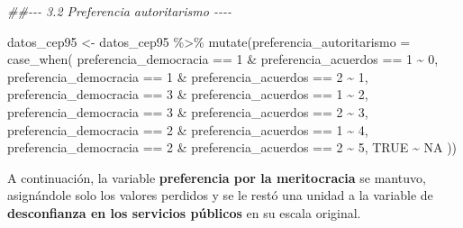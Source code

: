 \documentclass[
  spanish,
  a4paper,
  oneside]{scrbook}
\newenvironment{Shaded}{\begin{snugshade}}{\end{snugshade}}
\newcommand{\AttributeTok}[1]{\textcolor[rgb]{0.40,0.45,0.13}{#1}}
\newcommand{\ConstantTok}[1]{\textcolor[rgb]{0.56,0.35,0.01}{#1}}
\newcommand{\DecValTok}[1]{\textcolor[rgb]{0.68,0.00,0.00}{#1}}
\newcommand{\DocumentationTok}[1]{\textcolor[rgb]{0.37,0.37,0.37}{\textit{#1}}}
\newcommand{\FunctionTok}[1]{\textcolor[rgb]{0.28,0.35,0.67}{#1}}
\newcommand{\NormalTok}[1]{\textcolor[rgb]{0.00,0.23,0.31}{#1}}
\newcommand{\OtherTok}[1]{\textcolor[rgb]{0.00,0.23,0.31}{#1}}
\newcommand{\SpecialCharTok}[1]{\textcolor[rgb]{0.37,0.37,0.37}{#1}}
\begin{document}
\begin{Shaded}
\begin{Highlighting}[]
\DocumentationTok{\#\#{-}{-}{-} 3.2 Preferencia autoritarismo {-}{-}{-}{-}}

\NormalTok{datos\_cep95 }\OtherTok{\textless{}{-}}\NormalTok{ datos\_cep95 }\SpecialCharTok{\%\textgreater{}\%} 
  \FunctionTok{mutate}\NormalTok{(}\AttributeTok{preferencia\_autoritarismo =} \FunctionTok{case\_when}\NormalTok{(}
\NormalTok{    preferencia\_democracia }\SpecialCharTok{==} \DecValTok{1} \SpecialCharTok{\&}\NormalTok{ preferencia\_acuerdos }\SpecialCharTok{==} \DecValTok{1} \SpecialCharTok{\textasciitilde{}} \DecValTok{0}\NormalTok{, }
\NormalTok{    preferencia\_democracia }\SpecialCharTok{==} \DecValTok{1} \SpecialCharTok{\&}\NormalTok{ preferencia\_acuerdos }\SpecialCharTok{==} \DecValTok{2} \SpecialCharTok{\textasciitilde{}} \DecValTok{1}\NormalTok{,}
\NormalTok{    preferencia\_democracia }\SpecialCharTok{==} \DecValTok{3} \SpecialCharTok{\&}\NormalTok{ preferencia\_acuerdos }\SpecialCharTok{==} \DecValTok{1} \SpecialCharTok{\textasciitilde{}} \DecValTok{2}\NormalTok{, }
\NormalTok{    preferencia\_democracia }\SpecialCharTok{==} \DecValTok{3} \SpecialCharTok{\&}\NormalTok{ preferencia\_acuerdos }\SpecialCharTok{==} \DecValTok{2} \SpecialCharTok{\textasciitilde{}} \DecValTok{3}\NormalTok{, }
\NormalTok{    preferencia\_democracia }\SpecialCharTok{==} \DecValTok{2} \SpecialCharTok{\&}\NormalTok{ preferencia\_acuerdos }\SpecialCharTok{==} \DecValTok{1} \SpecialCharTok{\textasciitilde{}} \DecValTok{4}\NormalTok{,  }
\NormalTok{    preferencia\_democracia }\SpecialCharTok{==} \DecValTok{2} \SpecialCharTok{\&}\NormalTok{ preferencia\_acuerdos }\SpecialCharTok{==} \DecValTok{2} \SpecialCharTok{\textasciitilde{}} \DecValTok{5}\NormalTok{, }
    \ConstantTok{TRUE} \SpecialCharTok{\textasciitilde{}} \ConstantTok{NA}
\NormalTok{  ))}
\end{Highlighting}
\end{Shaded}

A continuación, la variable \textbf{preferencia por la meritocracia} se
mantuvo, asignándole solo los valores perdidos y se le restó una unidad
a la variable de \textbf{desconfianza en los servicios públicos} en su
escala original.
\end{document}
